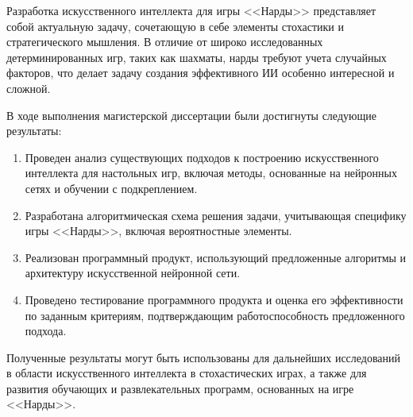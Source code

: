 Разработка искусственного интеллекта для игры <<Нарды>> представляет собой актуальную задачу, сочетающую в себе элементы стохастики и стратегического мышления. В отличие от широко исследованных детерминированных игр, таких как шахматы, нарды требуют учета случайных факторов, что делает задачу создания эффективного ИИ особенно интересной и сложной.

В ходе выполнения магистерской диссертации были достигнуты следующие результаты:
\begin{enumerate}
    \item Проведен анализ существующих подходов к построению искусственного интеллекта для настольных игр, включая методы, основанные на нейронных сетях и обучении с подкреплением.
    \item Разработана алгоритмическая схема решения задачи, учитывающая специфику игры <<Нарды>>, включая вероятностные элементы.
    \item Реализован программный продукт, использующий предложенные алгоритмы и архитектуру искусственной нейронной сети.
    \item Проведено тестирование программного продукта и оценка его эффективности по заданным критериям, подтверждающим работоспособность предложенного подхода.
\end{enumerate}

Полученные результаты могут быть использованы для дальнейших исследований в области искусственного интеллекта в стохастических играх, а также для развития обучающих и развлекательных программ, основанных на игре <<Нарды>>.
